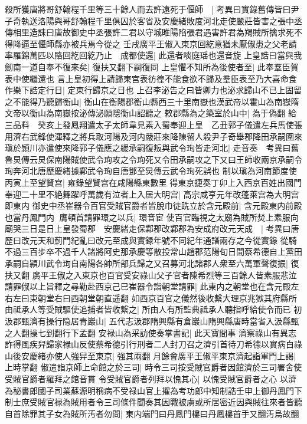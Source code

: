 殺所獲唐將哥舒翰程千里等三十餘人而去許遠死于偃師　|{
	考異曰實錄舊傳皆曰尹子奇執送洛陽與哥舒翰程千里俱囚於客省及安慶緒敗度河北走使嚴莊皆害之張中丞傳相里造誄曰唐故御史中丞張許二君以守城睢陽陷張君遇害許君為羯賊所擒求死不得降逼至偃師縣亦被兵焉今從之}
壬戌廣平王俶入東京回紇意猶未厭俶患之父老請率羅錦萬匹以賂回紇回紇乃止　成都使還|{
	此還者啖庭瑶也還音旋}
上皇誥曰當與我劒南一道自奉不復來矣|{
	復扶又翻下嗣復同}
上皇懼不知所為後使者至|{
	此奉羣臣賀表中使繼還也}
言上皇初得上請歸東宫表彷徨不能食欲不歸及羣臣表至乃大喜命食作樂下誥定行日|{
	定東行歸京之日也}
上召李泌告之曰皆卿力也泌求歸山不已上固留之不能得乃聽歸衡山|{
	衡山在衡陽郡衡山縣西三十里南嶽也漢武帝以霍山為南嶽隋文帝以衡山為南嶽按泌傳泌願隱衡山詔聽之}
敕郡縣為之築室於山中|{
	為于偽翻}
給三品料　癸亥上發鳳翔遣太子太師韋見素入蜀奉迎上皇　乙丑郭子儀遣左兵馬使張用濟右武鋒使渾釋之將兵取河陽及河内嚴莊來降陳留人殺尹子奇舉郡降田承嗣圍來瑱於頴川亦遣使來降郭子儀應之緩承嗣復叛與武令珣皆走河北|{
	走音奏　考異曰舊魯炅傳云炅保南陽賊使武令珣攻之令珣死又令田承嗣攻之下又曰王師收兩京承嗣令珣奔河北唐歷慶緒據鄴武令珣自唐鄧至炅傳云武令珣死誤也}
制以瑱為河南節度使　丙寅上至望賢宫|{
	雍錄望賢宫在咸陽縣東數里}
得東京捷奏丁卯上入西京百姓出國門奉迎二十里不絶舞躍呼萬歲有泣者上入居大明宫|{
	高宗咸亨元年改蓬萊宫為大明宫即東内}
御史中丞崔器令百官受賊官爵者皆脫巾徒跣立於含元殿前|{
	含元殿東内前殿也當丹鳳門内}
膺頓首請罪環之以兵|{
	環音宦}
使百官臨視之太廟為賊所焚上素服向廟哭三日是日上皇發蜀郡　安慶緒走保鄴郡改鄴郡為安成府改元天成　|{
	考異曰唐歷曰改元天和薊門紀亂曰改元至成與實録年號不同紀年通譜兩存之今從實錄}
從騎不過三百步卒不過千人諸將阿史那承慶等散投常山趙郡范陽旬日間蔡希德自上黨田承嗣自頴川武令珣自南陽各帥所部兵歸之又召募河北諸郡人衆至六萬軍聲復振|{
	復扶又翻}
廣平王俶之入東京也百官受安祿山父子官者陳希烈等三百餘人皆素服悲泣請罪俶以上旨釋之尋勒赴西京己巳崔器令詣朝堂請罪|{
	此東内之朝堂也在含元殿左右左曰束朝堂右曰西朝堂朝直遥翻}
如西京百官之儀然後收繫大理京兆獄其府縣所由祗承人等受賊驅使追捕者皆收繫之|{
	所由人有所監典祗承人聽指呼給使令而已}
初汲郡甄濟有操行隐居青巖山|{
	五代志汲郡隋興縣有倉巖山隋興縣唐時當省入汲縣甄之人翻操七到翻行下孟翻}
安禄山為采訪使奏掌書記|{
	此天寶間事}
濟察祿山有異志詐得風疾舁歸家禄山反使蔡希德引行刑者二人封刀召之濟引首待刀希德以實病白祿山後安慶緒亦使人強舁至東京|{
	強其兩翻}
月餘會廣平王俶平東京濟起詣軍門上謁|{
	上時掌翻}
俶遣詣京師上命館之於三司|{
	時令三司按受賊官爵者因館濟於三司署舍使受賊官爵者羅拜之館音貫}
令受賊官爵者列拜以愧其心|{
	以愧受賊官爵者之心}
以濟為秘書郎國子司業蘇源明稱病不受禄山官上擢為考功郎中知制誥壬申上御丹鳳門下制士庶受賊官禄為賊用者令三司條件聞奏其因戰被虜或所居密近因與賊往來者皆聽自首除罪其子女為賊所汚者勿問|{
	東内端門曰丹鳳門樓曰丹鳳樓首手又翻汚烏故翻}
